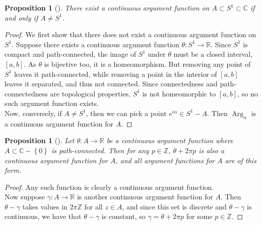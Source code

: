 \documentclass[reqno]{amsart}
\theoremstyle{plain}%
\newtheorem{proposition}[theorem]{Proposition}
\theoremstyle{definition}
\theoremstyle{remark}
\DeclareMathOperator{\Arg}{Arg}
\begin{document}
    \begin{proposition}[]
        There exist a continuous argument function on
        $ A \subset S^{1} \subset \mathbb{C}$ if and only if
        $A \neq S^{1}$.
    \end{proposition}
    
    \begin{proof}
        We first show that there does not exist a continuous argument function
        on $S^{1}$. Suppose there exists a continuous argument function
        $\theta  \colon S^{1} \to \mathbb{R}$. Since
        $S^{1}$ is compact and path-connected, 
        the image of $S^{1}$ under $\theta$ must be a closed interval, $\left[
        a,b\right] $. As $\theta$ is bijective too, it is a homeomorphism. But
        removing any point of $S^{1}$ leaves it path-connected, while removing
        a point in the interior of $\left[ a,b \right] $ leaves it separated,
        and thus not connected. Since connectedness and path-connectedness are
        topological properties, $S^{1}$ is not homeomorphic to $\left[ a,b
        \right] $, so no such argument function exists.\\
        Now, conversely, if $A \neq S^{1}$, then we can pick a point
        $e^{i \alpha} \in S^{1} - A$. Then
        $\Arg_{\alpha}$ is a continuous argument function for $A$.
    \end{proof}

    \begin{proposition}[]
        Let $\theta  \colon A \to \mathbb{R}$ be a continuous argument function
        where $A \subset \mathbb{C} - \left\{ 0 \right\} $ is path-connected.
        Then for any $p \in \mathbb{Z}$,
        $\theta + 2 \pi p$ is also a continuous argument function for
        $A$, and all argument functions for $A$ are of this form.
    \end{proposition}

    \begin{proof}
        Any such function is clearly a continuous argument function.\\
        Now suppose $\gamma  \colon A \to \mathbb{R}$ is another continuous
        argument function for $A$. Then $\theta - \gamma$ takes
        values in $2 \pi \mathbb{Z}$ for all $z \in A$, and since this
        set is discrete and $\theta - \gamma$ is continuous, we
        have that $\theta - \gamma$ is constant, so
        $\gamma = \theta + 2 \pi p$ for some $p \in \mathbb{Z}$.
    \end{proof}


%
\end{document}
